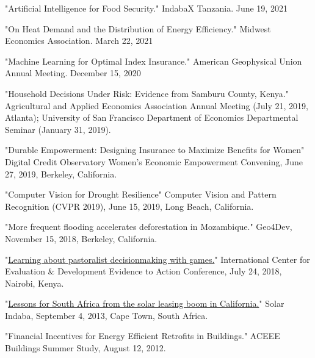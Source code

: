 \documentclass[11pt,letterpaper]{article}
\newcommand{\horse}{5pt} 	%
\newcommand{\littlehorse}{5pt}%
\newenvironment{itemize*}%
  {\begin{itemize}[topsep=0pt, partopsep=0pt, leftmargin=1.6em, itemindent=-1.6em, labelsep=0pt, labelwidth=0pt]%
    \setlength{\itemsep}{\littlehorse}%
    \setlength{\parskip}{0pt}%
    \interlinepenalty=10000}%
  {\end{itemize}\vspace{\horse}}
\begin{document}
\begin{itemize*}
\item[]{"Artificial Intelligence for Food Security." IndabaX Tanzania. June 19, 2021}

\item[]{"On Heat Demand and the Distribution of Energy Efficiency." Midwest Economics Association. March 22, 2021}

\item[]{"Machine Learning for Optimal Index Insurance." American Geophysical Union Annual Meeting. December 15, 2020}

\item[]{"Household Decisions Under Risk: Evidence from Samburu County, Kenya." Agricultural and Applied Economics Association Annual Meeting (July 21, 2019, Atlanta); University of San Francisco Department of Economics Departmental Seminar (January 31, 2019).}

\item[]{"Durable Empowerment: Designing Insurance to Maximize Benefits for Women" Digital Credit Observatory Women's Economic Empowerment Convening, June 27, 2019, Berkeley, California.}

\item[]{"Computer Vision for Drought Resilience" Computer Vision and Pattern Recognition (CVPR 2019), June 15, 2019, Long Beach, California.}

\item[]{"More frequent flooding accelerates deforestation in Mozambique." Geo4Dev, November 15, 2018, Berkeley, California.}

\item[]{"\href{https://basis.ucdavis.edu/news/africa-based-think-tank-event-highlights-role-evidence-development-policy}{Learning about pastoralist decisionmaking with games.}" International Center for Evaluation \& Development Evidence to Action Conference, July 24, 2018, Nairobi, Kenya.}

\item[]{"\href{http://climatepolicyinitiative.org/publication/improving-solar-policy-lessons-from-the-solar-leasing-boom-in-california/}{Lessons for South Africa from the solar leasing boom in California.}" Solar Indaba, September 4, 2013, Cape Town, South Africa.}

\item[]{"Financial Incentives for Energy Efficient Retrofits in Buildings."  ACEEE Buildings Summer Study, August 12, 2012.}
                
\end{itemize*} 
\end{document}
